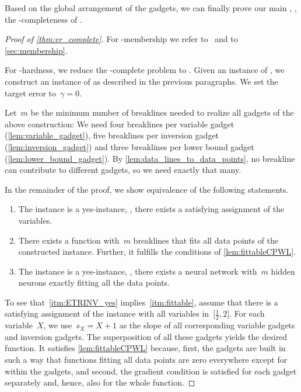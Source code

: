 \documentclass{toc}
\begin{document}
Based on the global arrangement of the gadgets, we can finally prove our main , \ie, the \ER-completeness of \trainNN.

\begin{proof}[Proof of \cref{thm:er_complete}]
    For \ER-membership we refer to~\cite{Abrahamsen2021_NeuralNetworks} and to \cref{sec:membership}.
    
    For \ER-hardness, we reduce the \ER-complete problem \ETRINV to \trainNN.
    Given an instance of \ETRINV, we construct an instance of \trainNN as described in the previous paragraphs.
    We set the target error to~$\gamma = 0$.

    Let~$m$ be the minimum number of breaklines needed to realize all gadgets of the above construction:
    We need four breaklines per variable gadget (\cref{lem:variable_gadget}), five breaklines per inversion gadget (\cref{lem:inversion_gadget}) and three breaklines per lower bound gadget (\cref{lem:lower_bound_gadget}).
    By \cref{lem:data_lines_to_data_points}, no breakline can contribute to different gadgets, so we need exactly that many.

    In the remainder of the proof, we show equivalence of the following statements.
    \begin{enumerate}[label=(\arabic*)]
        \item\label{itm:ETRINV_yes}
        The \ETRINV instance is a yes-instance, \ie, there exists a satisfying assignment of the variables.

        \item\label{itm:fittable}
        There exists a \CPWL function with~$m$ breaklines that fits all data points of the constructed \trainNN instance.
        Further, it fulfills the conditions of \cref{lem:fittableCPWL}.

        \item\label{itm:trainNN_yes}
        The \trainNN instance is a yes-instance, \ie, there exists a \fullyconnected \twolayer neural network with~$m$ hidden \ReLU neurons exactly fitting all the data points.
    \end{enumerate}

    To see that~\ref{itm:ETRINV_yes} implies~\ref{itm:fittable}, assume that there is a satisfying assignment of the \ETRINV instance with all variables in~$\bigl[\frac{1}{2}, 2\bigr]$.
    For each variable~$X$, we use~$s_X = X + 1$ as the slope of all corresponding variable gadgets and inversion gadgets.
    The superposition of all these gadgets yields the desired \CPWL function.
    It satisfies \cref{lem:fittableCPWL} because, first, the gadgets are built in such a way that functions fitting all data points are %
zero everywhere except for within the gadgets, and second, the gradient condition is satisfied for each gadget separately and, hence, also for the whole function.


\end{proof}
\end{document}
